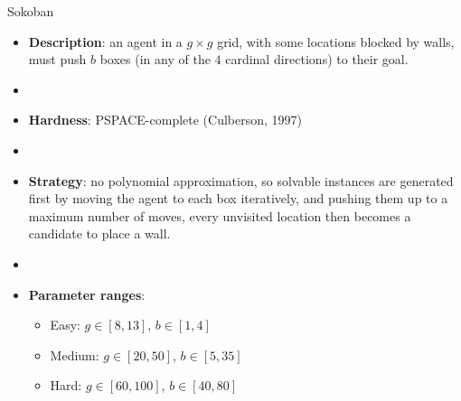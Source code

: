 \documentclass[aspectratio=169,xcolor=dvipsnames]{beamer}
\begin{document}
\begin{frame}{Sokoban}
    \begin{itemize}
        \item \textbf{Description}: an agent in a $g\times g$ grid, with some locations blocked by walls, must push $b$ boxes (in any of the $4$ cardinal directions) to their goal.
        \item[]
        \item \textbf{Hardness}: PSPACE-complete (Culberson, 1997) %
        \item[]
        \item \textbf{Strategy}: no polynomial approximation, so solvable instances are generated first by moving the agent to each box iteratively, and pushing them up to a maximum number of moves, every unvisited location then becomes a candidate to place a wall.
        \item[]
        \item \textbf{Parameter ranges}:
        \begin{itemize}
            \item Easy: $g\in[8, 13]$, $b\in[1, 4]$
            \item Medium: $g\in[20, 50]$, $b\in [5,35]$
            \item Hard: $g\in[60, 100]$, $b\in[40,80]$
        \end{itemize}
    \end{itemize}
\end{frame}
\end{document}
